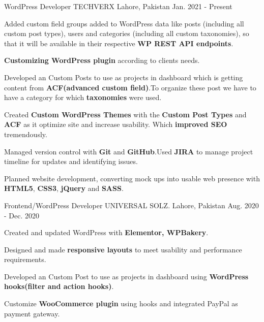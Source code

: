 

\begin{cventries}

  \cventry
    {WordPress Developer} %
    {TECHVERX} %
    {Lahore, Pakistan} %
    {Jan. 2021 - Present} %
    {
      \begin{cvitems} %
        \item {Added custom field groups added to WordPress data like posts (including all custom post types), users and categories (including all custom taxonomies), so that it will be available in their respective \textbf{WP REST API endpoints}.}
        \item {\textbf{Customizing WordPress plugin} according to clients needs.}
        \item {Developed an Custom Posts to use as projects in dashboard which is getting content from \textbf{ACF(advanced custom field)}.To organize these post we have to have a category for which \textbf{taxonomies} were used.}
        \item {Created \textbf{Custom WordPress Themes} with the \textbf{Custom Post Types} and \textbf{ACF} as it optimize site and increase usability. Which \textbf{improved SEO} tremendously.}
        \item {Managed version control with \textbf{Git} and \textbf{GitHub}.Used \textbf{JIRA} to manage project timeline for updates and identifying issues.}
        \item {Planned website development, converting mock ups into usable web presence with \textbf{HTML5}, \textbf{CSS3}, \textbf{jQuery} and \textbf{SASS}.}
      \end{cvitems}
    }

  \cventry
    {Frontend/WordPress Developer} %
    {UNIVERSAL SOLZ.} %
    {Lahore, Pakistan} %
    {Aug. 2020 - Dec. 2020} %
    {
      \begin{cvitems} %
        \item {Created and updated WordPress with \textbf{Elementor, WPBakery}.}
        \item {Designed and made \textbf{responsive layouts} to meet usability and performance requirements.}
        \item {Developed an Custom Post to use as projects in dashboard using \textbf{WordPress hooks(filter and action hooks)}.}
        \item {Customize \textbf{WooCommerce plugin} using hooks and integrated PayPal as payment gateway.}
      \end{cvitems}
    }


\end{cventries}
